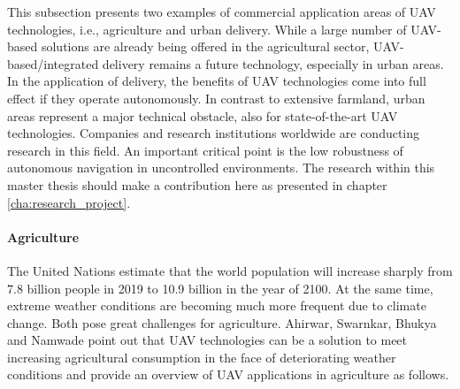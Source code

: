 This subsection presents two examples of commercial application areas of UAV technologies, i.e., agriculture and urban delivery.
While a large number of UAV-based solutions are already being offered in the agricultural sector,
UAV-based/integrated delivery remains a future technology, especially in urban areas.
In the application of delivery, the benefits of UAV technologies come into full effect if they operate autonomously.
In contrast to extensive farmland, urban areas represent a major technical obstacle, also for state-of-the-art UAV technologies.
Companies and research institutions worldwide are conducting research in this field.
An important critical point is the low robustness of autonomous navigation in uncontrolled environments.
The research within this master thesis should make a contribution here as presented in chapter \ref{cha:research_project}.


\paragraph{Agriculture}

The United Nations \cite{UN2019} estimate that the world population will increase sharply 
from 7.8 billion people in 2019 to 10.9 billion in the year of 2100.
At the same time, extreme weather conditions are becoming much more frequent due to climate change. \cite{NationalAcademies2016}
Both pose great challenges for agriculture.
Ahirwar, Swarnkar, Bhukya and Namwade \cite{Ahirwar2019} point out that 
UAV technologies can be a solution to meet increasing agricultural consumption in the face of deteriorating weather conditions
and provide an overview of UAV applications in agriculture as follows.

